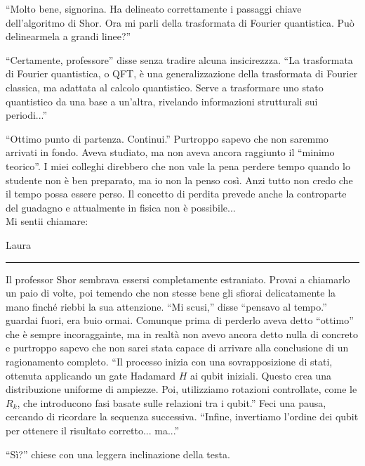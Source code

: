 \begin{dialogue}
 \enquote{Molto bene, signorina. Ha delineato correttamente i passaggi chiave dell'algoritmo di Shor. Ora mi parli della trasformata di Fourier quantistica. Può delinearmela a grandi linee?}

 \enquote{Certamente, professore} disse senza tradire alcuna insicirezzza. \enquote{La trasformata di Fourier quantistica, o QFT, è una generalizzazione della trasformata di Fourier classica, ma adattata al calcolo quantistico. Serve a trasformare uno stato quantistico da una base a un'altra, rivelando informazioni strutturali sui periodi...}

 \enquote{Ottimo punto di partenza. Continui.}
Purtroppo sapevo che non saremmo arrivati in fondo. Aveva studiato, ma non aveva ancora raggiunto il ``minimo teorico''. I miei colleghi direbbero che non vale la pena perdere tempo quando lo studente non è ben preparato, ma io non la penso così. Anzi tutto non credo che il tempo possa essere perso. Il concetto di perdita prevede anche la controparte del guadagno e attualmente in fisica non è possibile...\\
Mi sentii chiamare:

\vspace{1em}
\begin{center}Laura\end{center}
\hrule
\vspace{1em}
Il professor Shor sembrava essersi completamente estraniato. Provai a chiamarlo un paio di volte, poi temendo che non stesse bene gli sfiorai delicatamente la mano finché riebbi la sua attenzione.
 \enquote{Mi scusi,} disse \enquote{pensavo al tempo.}
 guardai fuori, era buio ormai. Comunque prima di perderlo aveva detto  ``ottimo'' che è sempre incoraggainte, ma in realtà non avevo ancora detto nulla di concreto e purtroppo sapevo che non sarei stata capace di arrivare alla conclusione di un ragionamento completo.
\enquote{Il processo inizia con una sovrapposizione di stati, ottenuta applicando un gate Hadamard \( H \) ai qubit iniziali. Questo crea una distribuzione uniforme di ampiezze. Poi, utilizziamo rotazioni controllate, come le \( R_k \), che introducono fasi basate sulle relazioni tra i qubit.} Feci una pausa, cercando di ricordare la sequenza successiva. \enquote{Infine, invertiamo l'ordine dei qubit per ottenere il risultato corretto... ma...}

 \enquote{Sì?} chiese con una leggera inclinazione della testa.


\end{dialogue}
